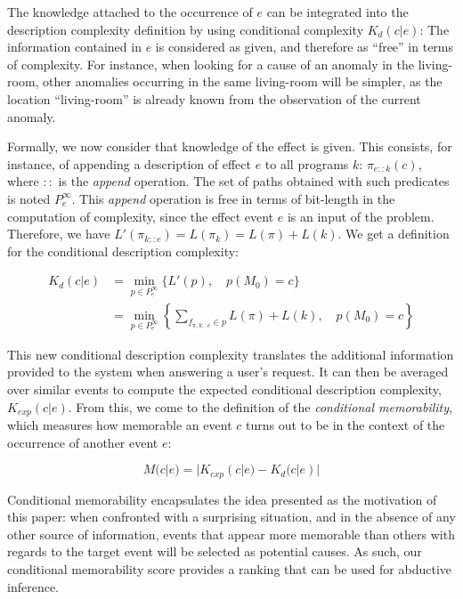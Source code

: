 \documentclass[entropy,article,submit,moreauthors,pdftex]{Definitions/mdpi}
\begin{document}
The knowledge attached to the occurrence of $e$ can be integrated into the description complexity definition by using conditional complexity $K_d(c | e)$: The information contained in $e$ is considered as given, and therefore as ``free'' in terms of complexity. For instance, when looking for a cause of
an anomaly in the living-room, other anomalies occurring in the same
living-room will be simpler, as the location ``living-room'' is already known
from the observation of the current anomaly.

Formally, we now consider that knowledge of the effect is given. This consists, for instance, of appending a description of effect $e$  to all programs $k$:
$\pi_{e::k}(c)$, where $::$ is the \emph{append} operation. The set of paths obtained with such predicates is noted $P^\infty_e$. This \emph{append} operation is free in terms of bit-length in the computation of complexity, since the effect event $e$ is an input of the problem. Therefore, we have $L'(\pi_{k::e}) = L(\pi_k) = L(\pi) + L(k)$. We get a definition for the conditional description complexity:

\begin{align}
    \label{eq:abd_k}
    K_d(c | e) & = \min_{p \in P^\infty_e} \{L'(p), \quad p(M_0)=c \}                                                \\
               & = \min_{p \in P^\infty_e} \left\{\sum_{f_{\pi, k::e} \in p} L(\pi) + L(k), \quad p(M_0) = c\right\}
\end{align}

This new conditional description complexity translates the additional information provided to the
system when answering a user's request. It can then be averaged over similar events to compute the expected conditional description complexity, $K_{exp}(c|e)$. From this, we come to the definition of the \emph{conditional memorability}, which measures how memorable an event $c$ turns out to be in the context of the occurrence of another event $e$:

\begin{equation}
    \label{eq:cond_mem}
    M(c|e) = |K_{exp}(c|e) - K_d(c|e)|
\end{equation}

Conditional memorability encapsulates the idea
presented as the motivation of this paper: when confronted with a surprising
situation, and in the absence of any other source of information, events that appear more memorable than others with regards to the target event will be selected as potential causes. As such, our conditional memorability score provides a ranking that can be used for abductive inference.
\end{document}
